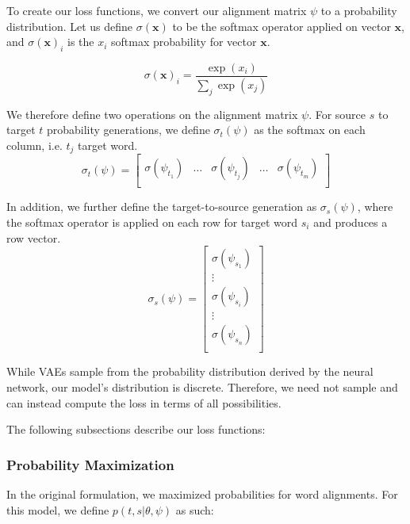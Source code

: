\documentclass[twoside,twocolumn]{article}
\renewcommand{\vec}[1]{\mathbf{#1}}
\begin{document}
To create our loss functions, we convert our alignment matrix $\psi$
to a probability distribution. Let us define $\sigma(\vec{x})$ to be
the softmax operator applied on vector $\vec{x}$, and $\sigma(\vec{x})_i$ is
the $x_i$ softmax probability for vector $\vec{x}$.

\begin{equation}
\sigma(\vec{x})_i = \frac{\exp(x_i)}{\sum_j\exp(x_j)}
\end{equation}

We therefore define two operations on the alignment matrix $\psi$. For source
$s$ to target $t$ probability generations, we define $\sigma_t(\psi)$ as the
softmax on each column, i.e. $t_j$ target word.
\begin{equation}
  \sigma_t(\psi) = \left[
    \begin{matrix}
      \sigma(\psi_{t_1}) &
      \hdots &
      \sigma(\psi_{t_j}) &
      \hdots &
      \sigma(\psi_{t_m})  \\
    \end{matrix}
\right]
\end{equation}

In addition, we further define the target-to-source generation as
$\sigma_s(\psi)$, where the softmax operator is applied on each row for target
word $s_i$ and produces a row vector.
\begin{equation}
  \sigma_s(\psi) = \left[
    \begin{matrix}
      \sigma(\psi_{s_1})  \\
      \vdots \\
      \sigma(\psi_{s_i})  \\
      \vdots \\
      \sigma(\psi_{s_n})  \\
    \end{matrix}
\right]
\end{equation}

While VAEs sample from the probability distribution derived by the neural
network, our model's distribution is discrete. Therefore, we need not
sample and can instead compute the loss in terms of all possibilities.

The following subsections describe our loss functions:

\subsubsection{Probability Maximization}

In the original formulation, we maximized probabilities for word
alignments. For this model, we define $p(t, s | \theta, \psi)$ as such:
\end{document}
